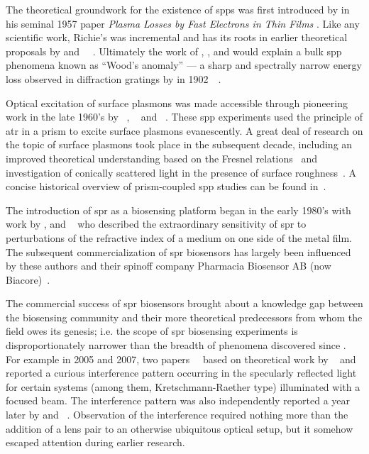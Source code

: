 The theoretical groundwork for the existence of \glspl{spp} was first
introduced by  in his seminal 1957 paper \textit{Plasma Losses by
  Fast Electrons in Thin Films} \cite{ritchie1957plasma}.  Like any scientific
work, Richie's was incremental and has its roots in earlier theoretical
proposals by  and
~\cite{bohm1951collective}~\cite{pines1952collective}.  Ultimately
the work of , , and  would explain a bulk
\gls{spp} phenomena known as ``Wood's anomaly'' --- a sharp and spectrally
narrow energy loss observed in diffraction gratings by  in
1902~\cite{wood1902remarkable}~\cite{rayleigh1907remarkable}.

Optical excitation of surface plasmons was made accessible through
pioneering work in the late 1960's by
~\cite{kretschmann1968},
~\cite{raether1988springer} and
~\cite{otto1968excitation}.  These \gls{spp} experiments used the
principle of \gls{atr} in a prism to excite surface
plasmons evanescently.  A great deal of research on the topic of surface
plasmons took place in the subsequent decade, including an improved
theoretical understanding based on the Fresnel
relations~\cite{chen1976excitation} and investigation of conically scattered
light in the presence of surface roughness~\cite{simon1976directional}.  A
concise historical overview of prism-coupled \gls{spp} studies can be found
in~\cite{raether1997surface}.

The introduction of \gls{spr} as a biosensing platform began in the early
1980's with work by ,  and
~\cite{liedberg1983surface} who described the extraordinary
sensitivity of \gls{spr} to perturbations of the refractive
index of a medium on one side of the metal film.  The subsequent
commercialization of \gls{spr} biosensors has largely been influenced by these
authors and their spinoff company Pharmacia Biosensor AB (now
Biacore)~\cite{liedberg1995biosensing}.

The commercial success of \gls{spr} biosensors brought about a knowledge gap between
the biosensing community and their more theoretical predecessors from whom the
field owes its genesis; i.e\@. the scope of \gls{spr} biosensing experiments is
disproportionately narrower than the breadth of phenomena discovered since
.  For example in 2005 and 2007, two
papers~\cite{andaloro2005optical}~\cite{simon2007observation} based on
theoretical work by ~\cite{chuang1986lateral} and 
\cite{chen1976excitation} reported a curious interference pattern occurring in
the specularly reflected light for certain systems (among them,
Kretschmann-Raether type) illuminated with a focused beam.  The interference
pattern was also independently reported a year later by  and
~\cite{schumann2008near}.  Observation of the interference
required nothing more than the addition of a lens pair to an otherwise
ubiquitous optical setup, but it somehow escaped attention during earlier
research.

